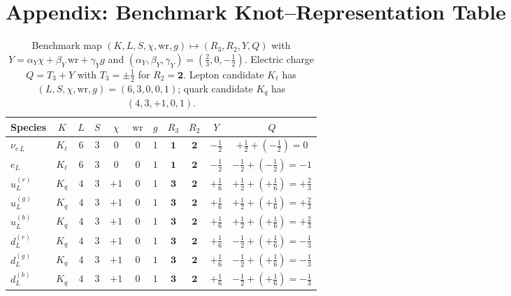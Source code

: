\documentclass[10pt,reprint,aps,onecolumn,nofootinbib]{revtex4-2}
\begin{document}
\section{Appendix: Benchmark Knot–Representation Table}\label{app:knot-rep-table}
    \begin{table}[t]
    \centering
    \small
    \caption{Benchmark map $(K, L, S, \chi, \mathrm{wr}, g)\mapsto (R_3,R_2,Y,Q)$ with
        $Y=\alpha_Y\chi+\beta_Y\,\mathrm{wr}+\gamma_Y g$ and $(\alpha_Y,\beta_Y,\gamma_Y)=(\tfrac{2}{3},0,-\tfrac{1}{2})$.
        Electric charge $Q=T_3+Y$ with $T_3=\pm\tfrac12$ for $R_2=\mathbf{2}$.
        Lepton candidate $K_\ell$ has $(L,S,\chi,\mathrm{wr},g)=(6,3,0,0,1)$; quark candidate $K_q$ has $(4,3,+1,0,1)$.}
    \label{tab:knot-rep-benchmark}
    \begin{tabular}{lcccccccccc}
    \toprule
    Species & $K$ & $L$ & $S$ & $\chi$ & $\mathrm{wr}$ & $g$ & $R_3$ & $R_2$ & $Y$ & $Q$ \\
    \midrule
    $\nu_{e\,L}$  & $K_\ell$ & $6$ & $3$ & $0$ & $0$ & $1$ & $\mathbf{1}$ & $\mathbf{2}$ & $-\tfrac{1}{2}$ & $+\tfrac{1}{2}+(-\tfrac{1}{2})=0$ \\
    $e_{L}$       & $K_\ell$ & $6$ & $3$ & $0$ & $0$ & $1$ & $\mathbf{1}$ & $\mathbf{2}$ & $-\tfrac{1}{2}$ & $-\tfrac{1}{2}+(-\tfrac{1}{2})=-1$ \\
    \addlinespace[0.25em]
    $u_{L}^{(r)}$ & $K_q$    & $4$ & $3$ & $+1$& $0$ & $1$ & $\mathbf{3}$ & $\mathbf{2}$ & $+\tfrac{1}{6}$ & $+\tfrac{1}{2}+(+\tfrac{1}{6})=+\tfrac{2}{3}$ \\
    $u_{L}^{(g)}$ & $K_q$    & $4$ & $3$ & $+1$& $0$ & $1$ & $\mathbf{3}$ & $\mathbf{2}$ & $+\tfrac{1}{6}$ & $+\tfrac{1}{2}+(+\tfrac{1}{6})=+\tfrac{2}{3}$ \\
    $u_{L}^{(b)}$ & $K_q$    & $4$ & $3$ & $+1$& $0$ & $1$ & $\mathbf{3}$ & $\mathbf{2}$ & $+\tfrac{1}{6}$ & $+\tfrac{1}{2}+(+\tfrac{1}{6})=+\tfrac{2}{3}$ \\
    $d_{L}^{(r)}$ & $K_q$    & $4$ & $3$ & $+1$& $0$ & $1$ & $\mathbf{3}$ & $\mathbf{2}$ & $+\tfrac{1}{6}$ & $-\tfrac{1}{2}+(+\tfrac{1}{6})=-\tfrac{1}{3}$ \\
    $d_{L}^{(g)}$ & $K_q$    & $4$ & $3$ & $+1$& $0$ & $1$ & $\mathbf{3}$ & $\mathbf{2}$ & $+\tfrac{1}{6}$ & $-\tfrac{1}{2}+(+\tfrac{1}{6})=-\tfrac{1}{3}$ \\
    $d_{L}^{(b)}$ & $K_q$    & $4$ & $3$ & $+1$& $0$ & $1$ & $\mathbf{3}$ & $\mathbf{2}$ & $+\tfrac{1}{6}$ & $-\tfrac{1}{2}+(+\tfrac{1}{6})=-\tfrac{1}{3}$ \\
    \bottomrule
    \end{tabular}
    \end{table}
\end{document}
